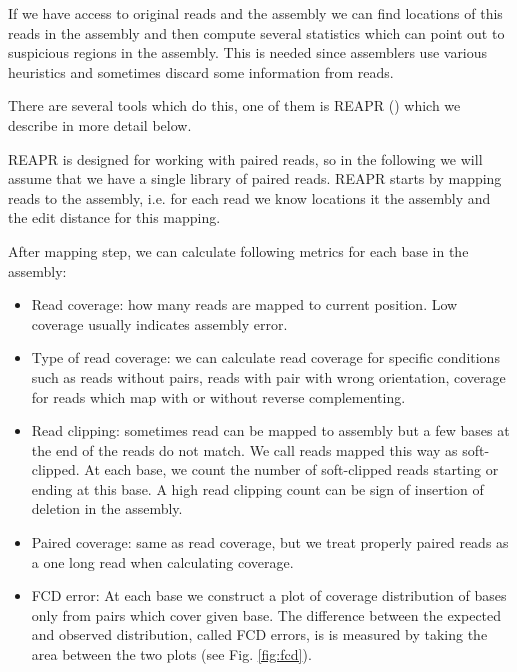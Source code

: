 If we have access to original reads and the assembly we can find locations
of this reads in the assembly and then compute several statistics which
can point out to suspicious regions in the assembly.
This is needed since assemblers use various heuristics and sometimes discard
some information from reads. 

There are several tools which do this, one of them is REAPR (\cite{Reapr}) which we describe
in more detail below.

REAPR is designed for working with paired reads, so in the following we will assume that
we have a single library of paired reads.
REAPR starts by mapping reads to the assembly, i.e. for each read we know locations it the assembly
and the edit distance for this mapping.

After mapping step, we can calculate following metrics for each base in the assembly:
\begin{itemize}
\item Read coverage: how many reads are mapped to current position. Low coverage usually indicates assembly error.
\item Type of read coverage: we can calculate read coverage for specific conditions such as reads without pairs,
reads with pair with wrong orientation, coverage for reads which map with or without reverse complementing.
\item Read clipping: sometimes read can be mapped to assembly but a few bases at the end of the reads do not match.
We call reads mapped this way as soft-clipped.
At each base, we count the number of soft-clipped reads starting or ending at this base. A high read
clipping count can be sign of insertion of deletion in the assembly.
\item Paired coverage: same as read coverage, but we treat properly paired reads as a one long read when calculating coverage.
\item FCD error: At each base we construct a plot of coverage distribution of bases
  only from pairs which cover given base. The difference between the expected
  and observed distribution, called FCD errors, is is measured by taking the area between the two plots (see Fig. \ref{fig:fcd}).
\end{itemize}


